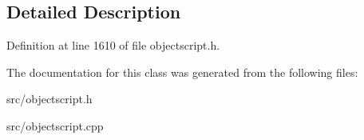 \subsection{Detailed Description}


Definition at line 1610 of file objectscript.\+h.



The documentation for this class was generated from the following files\+:\begin{DoxyCompactItemize}
\item 
src/objectscript.\+h\item 
src/objectscript.\+cpp\end{DoxyCompactItemize}
